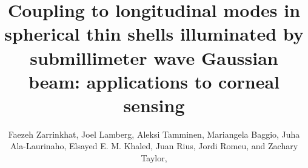 \documentclass{osa-article}
\begin{document}
\nolinenumbers
\title{Coupling to longitudinal modes in spherical thin shells illuminated by submillimeter wave Gaussian beam: applications to corneal sensing}

\author{Faezeh Zarrinkhat, Joel Lamberg, Aleksi Tamminen, Mariangela Baggio, Juha Ala-Laurinaho, Elsayed E. M. Khaled, Juan Rius, Jordi Romeu, and Zachary Taylor,}

\address{CommSensLab, Technical University of Catalonia/UPC, Barcelona 08034, Spain\\
Department of Electronics and Nanoengineering, Millilab, Aalto University, Espoo 02150, Finland\\
Department of Electrical Engineering, Assiut University, Assiut 71515, Egypt
\\
High Institute of Engineering and Technology, Sohag 82524, Egypt}



\end{document}
